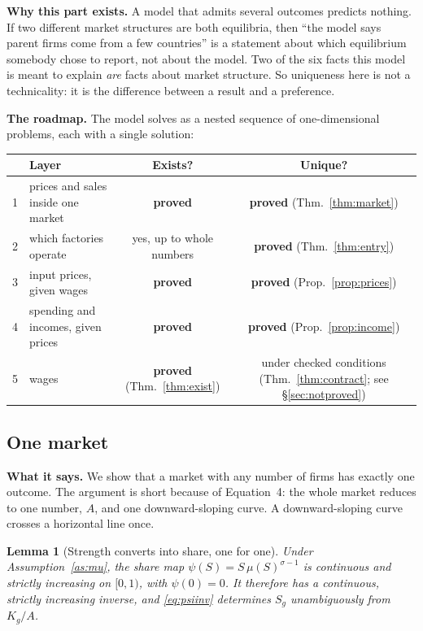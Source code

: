 \documentclass[11pt]{article}
\newenvironment{keypoint}
  {\begin{lrbox}{\kbox}\begin{minipage}{0.93\textwidth}\vspace{3pt}}
  {\vspace{3pt}\end{minipage}\end{lrbox}\begin{center}\fbox{\usebox{\kbox}}\end{center}}
\newcommand{\says}[1]{\smallskip\noindent\textbf{What it says.} #1\smallskip}
\theoremstyle{plain}
\newtheorem{lemma}{Lemma}
\theoremstyle{remark}
\theoremstyle{definition}
\begin{document}
\begin{keypoint}
\textbf{Why this part exists.} A model that admits several outcomes predicts nothing.
If two different market structures are both equilibria, then ``the model says parent
firms come from a few countries'' is a statement about which equilibrium somebody
chose to report, not about the model. Two of the six facts this model is meant to
explain \emph{are} facts about market structure. So uniqueness here is not a
technicality: it is the difference between a result and a preference.

\smallskip
\textbf{The roadmap.} The model solves as a nested sequence of one-dimensional
problems, each with a single solution:

\smallskip
\begin{center}
\begin{tabular}{clcc}
\toprule
 & Layer & Exists? & Unique?\\
\midrule
1 & prices and sales inside one market & \textbf{proved} & \textbf{proved} (Thm.~\ref{thm:market})\\
2 & which factories operate & yes, up to whole numbers & \textbf{proved} (Thm.~\ref{thm:entry})\\
3 & input prices, given wages & \textbf{proved} & \textbf{proved} (Prop.~\ref{prop:prices})\\
4 & spending and incomes, given prices & \textbf{proved} & \textbf{proved} (Prop.~\ref{prop:income})\\
5 & wages & \textbf{proved} (Thm.~\ref{thm:exist}) & under checked conditions (Thm.~\ref{thm:contract}; see \S\ref{sec:notproved})\\
\bottomrule
\end{tabular}
\end{center}
\end{keypoint}

\subsection{One market}

\says{We show that a market with any number of firms has exactly one outcome. The
argument is short because of Equation~4: the whole market reduces to one number, $A$,
and one downward-sloping curve. A downward-sloping curve crosses a horizontal line
once.}

\begin{lemma}[Strength converts into share, one for one]\label{lem:psi}
Under Assumption~\ref{as:mu}, the share map $\psi(S)=S\,\mu(S)^{\sigma-1}$ is
continuous and strictly increasing on $[0,1)$, with $\psi(0)=0$. It therefore has a
continuous, strictly increasing inverse, and \eqref{eq:psiinv} determines $S_g$
unambiguously from $K_g/A$.
\end{lemma}
\end{document}
